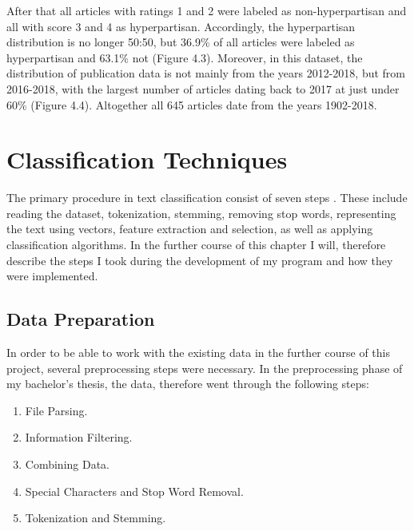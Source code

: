 \documentclass[a4paper, 11pt,titlepage,oneside,openany]{book}
\begin{document}
After that all articles with ratings 1 and 2 were labeled as non-hyperpartisan and all with score 3 and 4 as hyperpartisan.
Accordingly, the hyperpartisan distribution is no longer 50:50, but 36.9\% of all articles were labeled as hyperpartisan and 63.1\% not (Figure 4.3).
\noindent Moreover, in this dataset, the distribution of publication data is not mainly from the years 2012-2018, but from 2016-2018, with the largest number of articles dating back to 2017 at just under 60\% (Figure 4.4). Altogether all 645 articles date from the years 1902-2018.




\chapter{Classification Techniques}
The primary procedure in text classification consist of seven steps \cite{textclassification}. These include  reading the dataset, tokenization, stemming, removing stop words, representing the text using vectors, feature extraction and selection, as well as applying classification algorithms. In the further course of this chapter I  will, therefore describe the steps I took during the development of my program and how they were implemented.

\section{Data Preparation}
In order to be able to work with the existing data in the further course of this project, several preprocessing steps were necessary. In the preprocessing phase of my bachelor's thesis, the data, therefore went through the following steps:
\begin{enumerate}
	\item File Parsing. 
	\item Information Filtering.
	\item Combining Data.
	\item Special Characters and Stop Word Removal.
	\item Tokenization and Stemming.
\end{enumerate}	
\end{document}
